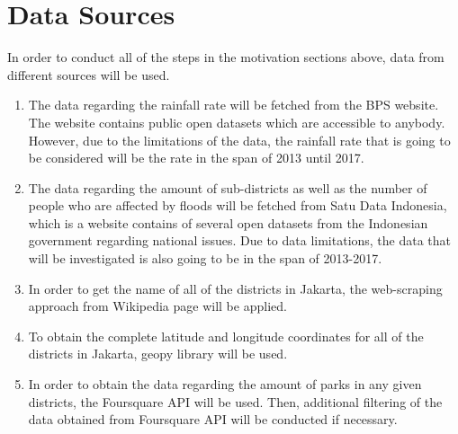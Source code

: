 \section{Data Sources}
In order to conduct all of the steps in the motivation sections above, data from different sources will be used. 
\begin{enumerate}
\item The data regarding the rainfall rate will be fetched from the BPS website. The website contains public open datasets which are accessible to anybody. However, due to the limitations of the data, the rainfall rate that is going to be considered will be the rate in the span of 2013 until 2017.
\item The data regarding the amount of sub-districts as well as the number of people who are affected by floods will be fetched from Satu Data Indonesia, which is a website contains of several open datasets from the Indonesian government regarding national issues. Due to data limitations, the data that will be investigated is also going to be in the span of 2013-2017.
\item In order to get the name of all of the districts in Jakarta, the web-scraping approach from Wikipedia page will be applied.
\item To obtain the complete latitude and longitude coordinates for all of the districts in Jakarta, geopy library will be used.
\item In order to obtain the data regarding the amount of parks in any given districts, the Foursquare API will be used. Then, additional filtering of the data obtained from Foursquare API will be conducted if necessary. 
\end{enumerate}

